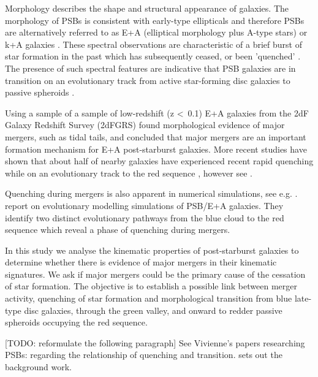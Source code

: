 Morphology describes the shape and structural appearance of galaxies. The morphology of PSBs is consistent with early-type ellipticals and therefore PSBs are alternatively referred to as E+A (elliptical morphology plus A-type stars) or k+A galaxies \citep{1983ApJ...270....7D,1996ApJ...466..104Z,2009ARA&A..47..159B}. These spectral observations are characteristic of a brief burst of star formation in the past which has subsequently ceased, or been 'quenched' \citep{1983ApJ...270....7D,1987MNRAS.229..423C,1997A&A...325.1025P}. The presence of such spectral features are indicative that PSB galaxies are in transition on an evolutionary track from active star-forming disc galaxies to passive spheroids \citep{2004MNRAS.355..713B,2012MNRAS.420..672S,2013MNRAS.429.2212M}. 

Using a sample of a sample of low-redshift (z \textless\ 0.1) E+A galaxies from the 2dF Galaxy Redshift Survey (2dFGRS) \citet{2004MNRAS.355..713B} found morphological evidence of major mergers, such as tidal tails, and concluded that major mergers are an important formation mechanism for E+A post-starburst galaxies. More recent studies have shown that about half of nearby galaxies have experienced recent rapid quenching while on an evolutionary track to the red sequence \citep{Martin_2007,10.1111/j.1365-2966.2009.14537.x,2015MNRAS.450..435S}, however see \cite{2017ApJ...845..145W}. 

Quenching during mergers is also apparent in numerical simulations, see e.g. \cite{2019MNRAS.484.2447D}. \citet{2019NatAs...3..440P} report on evolutionary modelling simulations of PSB/E+A galaxies. They identify two distinct evolutionary pathways from the blue cloud to the red sequence which reveal a phase of quenching during mergers.

In this study we analyse the kinematic properties of post-starburst galaxies to determine whether there is evidence of major mergers in their kinematic signatures. We ask if major mergers could be the primary cause of the cessation of star formation. The objective is to establish a possible link between merger activity, quenching of star formation and morphological transition from blue late-type disc galaxies, through the green valley, and onward to redder passive spheroids occupying the red sequence.

[TODO: reformulate the following paragraph] See Vivienne's  papers researching PSBs: \citet{2017MNRAS.472.1401A} regarding the relationship of quenching and transition. \citet{2016MNRAS.463..832W} sets out the background work.

